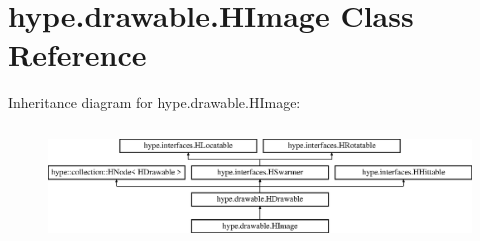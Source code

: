 \hypertarget{classhype_1_1drawable_1_1_h_image}{\section{hype.\-drawable.\-H\-Image Class Reference}
\label{classhype_1_1drawable_1_1_h_image}
}
Inheritance diagram for hype.\-drawable.\-H\-Image\-:\begin{figure}[H]
\begin{center}
\leavevmode
\includegraphics[height=3.111111cm]{classhype_1_1drawable_1_1_h_image}
\end{center}
\end{figure}
